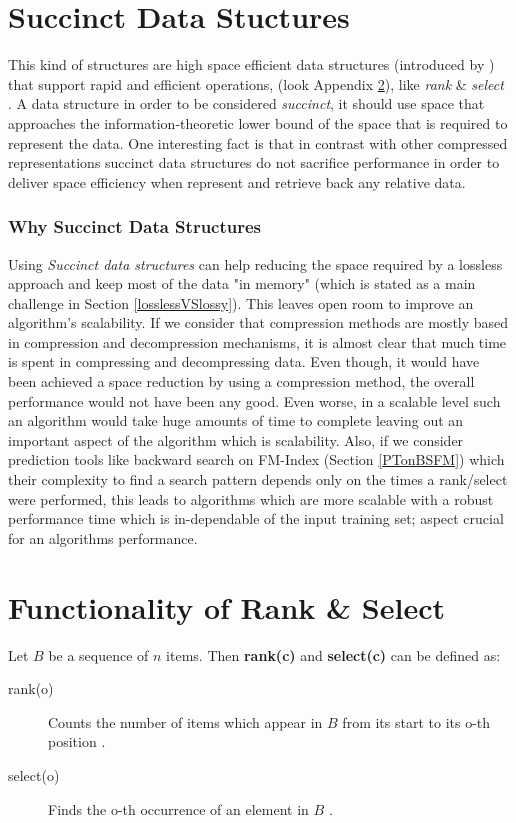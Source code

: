 \newpage
\appendix


\section{Succinct Data Stuctures} \label{App:SDS}
This kind of structures are high space efficient data structures (introduced by \citeauthor{Jacobson89} \citeyear{Jacobson89}) that support rapid and efficient operations, (look Appendix \ref{App:rank_select}), like \emph{rank} \& \emph{select} \cite{dillabaugh_2007, Jacobson89}. A data structure in order to be considered \emph{succinct}, it should use space that approaches the information-theoretic lower bound of the space that is required to represent the data. One interesting fact is that in contrast with other compressed representations succinct data structures do not sacrifice performance in order to deliver space efficiency when represent and retrieve back any relative data. 
\subsubsection{Why Succinct Data Structures}
Using \emph{Succinct data structures} can help reducing the space required by a lossless approach and keep most of the data "in memory" (which is stated as a main challenge in Section \ref{losslessVSlossy}). This leaves open room to improve an algorithm's scalability. If we consider that compression methods are mostly based in compression and decompression mechanisms, it is almost clear that much time is spent in compressing and decompressing data. Even though, it would have been achieved a space reduction by using a compression method, the overall performance would not have been any good. Even worse, in a scalable level such an algorithm would take huge amounts of time to complete leaving out an important aspect of the algorithm which is scalability. Also, if we consider prediction tools like backward search on FM-Index (Section \ref{PTonBSFM}) which their complexity to find a search pattern depends only on the times a rank/select were performed, this leads to algorithms which are more scalable with a robust performance time which is in-dependable of the input training set; aspect crucial for an algorithms performance.



\section{Functionality of Rank \& Select}\label{App:rank_select}
Let \(B\) be a sequence of \(n\) items. Then \textbf{rank(c)} and \textbf{select(c)} can be defined as:
\begin{description}
  \item[rank(o)] 
  Counts the number of items which appear in \(B\) from its start to its o-th position \cite{Jacobson89}.
  \item[select(o)]
  Finds the o-th occurrence of an element in \(B\) \cite{Jacobson89}.
\end{description}

